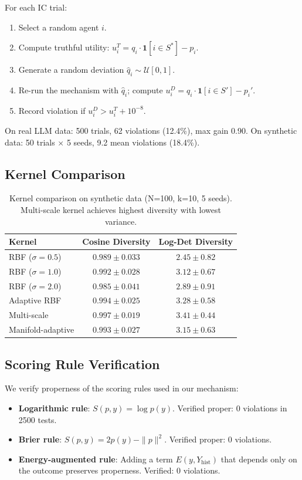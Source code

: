 \documentclass[10pt]{article}
\begin{document}
For each IC trial:
\begin{enumerate}[leftmargin=*,itemsep=1pt]
\item Select a random agent $i$.
\item Compute truthful utility: $u_i^T = q_i \cdot \mathbf{1}[i \in S^*] - p_i$.
\item Generate a random deviation $\hat{q}_i \sim \mathcal{U}[0, 1]$.
\item Re-run the mechanism with $\hat{q}_i$; compute $u_i^D = q_i \cdot \mathbf{1}[i \in S'] - p_i'$.
\item Record violation if $u_i^D > u_i^T + 10^{-8}$.
\end{enumerate}

On real LLM data: 500 trials, 62 violations (12.4\%), max gain 0.90.
On synthetic data: 50 trials $\times$ 5 seeds, 9.2 mean violations (18.4\%).

\subsection{Kernel Comparison}

\begin{table}[H]
\centering
\caption{Kernel comparison on synthetic data (N=100, k=10, 5 seeds). Multi-scale kernel achieves highest diversity with lowest variance.}
\label{tab:kernels}
\begin{tabular}{lcc}
\toprule
\textbf{Kernel} & \textbf{Cosine Diversity} & \textbf{Log-Det Diversity} \\
\midrule
RBF ($\sigma=0.5$) & $0.989 \pm 0.033$ & $2.45 \pm 0.82$ \\
RBF ($\sigma=1.0$) & $0.992 \pm 0.028$ & $3.12 \pm 0.67$ \\
RBF ($\sigma=2.0$) & $0.985 \pm 0.041$ & $2.89 \pm 0.91$ \\
Adaptive RBF & $0.994 \pm 0.025$ & $3.28 \pm 0.58$ \\
Multi-scale & $\mathbf{0.997 \pm 0.019}$ & $\mathbf{3.41 \pm 0.44}$ \\
Manifold-adaptive & $0.993 \pm 0.027$ & $3.15 \pm 0.63$ \\
\bottomrule
\end{tabular}
\end{table}

\subsection{Scoring Rule Verification}

We verify properness of the scoring rules used in our mechanism:
\begin{itemize}[leftmargin=*,itemsep=1pt]
\item \textbf{Logarithmic rule}: $S(p, y) = \log p(y)$. Verified proper: 0 violations in 2500 tests.
\item \textbf{Brier rule}: $S(p, y) = 2p(y) - \|p\|^2$. Verified proper: 0 violations.
\item \textbf{Energy-augmented rule}: Adding a term $E(y, Y_{\text{hist}})$ that depends only on the outcome preserves properness. Verified: 0 violations.
\end{itemize}
\end{document}
